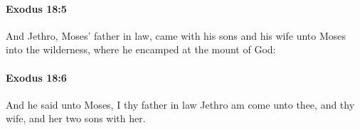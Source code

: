 		\paragraph{Exodus 18:5} %
			\label{EXODUS-18-5}

			And Jethro, Moses' father in law, came with his sons and his wife unto Moses into the wilderness, where he encamped at the mount of God:


		\paragraph{Exodus 18:6} %
			\label{EXODUS-18-6}

			And he said unto Moses, I thy father in law Jethro am come unto thee, and thy wife, and her two sons with her.


